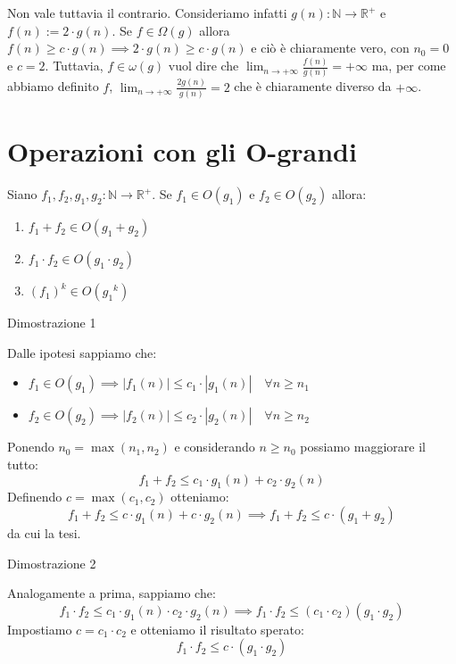 \documentclass[12pt]{report}
\newcommand{\N}{\mathbb{N}}
\newcommand{\R}{\mathbb{R}}
\begin{document}
	Non vale tuttavia il contrario. Consideriamo infatti $g(n): \N \to \R^+$ e $f(n) := 2 \cdot g(n)$.
	Se $f \in \Omega(g)$ allora $f(n) \ge c \cdot g(n) \implies 2 \cdot g(n) \ge c \cdot g(n)$ e ciò è chiaramente vero, con $n_0 = 0$ e $c = 2$.
	Tuttavia, $f \in \omega(g)$ vuol dire che $\lim_{n \to +\infty} \frac{f(n)}{g(n)} = +\infty$ ma, per come abbiamo definito $f$, $\lim_{n \to +\infty} \frac{2g(n)}{g(n)} = 2$ che è chiaramente diverso da $+\infty$.
	
	\section{Operazioni con gli O-grandi}
	Siano $f_1, f_2, g_1, g_2: \N \to \R^+$.
	Se $f_1 \in O(g_1)$ e $f_2 \in O(g_2)$ allora:
	\begin{enumerate}
		
		\item $f_1 + f_2 \in O(g_1 + g_2)$
		
		\item $f_1 \cdot f_2 \in O(g_1 \cdot g_2)$
		
		\item $(f_1)^k \in O({g_1}^k)$
		
	\end{enumerate}
	
	\begin{dimostrazione}{Dimostrazione 1}{}
		
		Dalle ipotesi sappiamo che:
		\begin{itemize}
			
			\item $f_1 \in O(g_1) \implies |f_1(n)| \le c_1 \cdot |g_1(n)| \quad \forall n \ge n_1$
			
			\item $f_2 \in O(g_2) \implies |f_2(n)| \le c_2 \cdot |g_2(n)| \quad \forall n \ge n_2$
			
		\end{itemize}
		Ponendo $n_0 = \max(n_1, n_2)$ e considerando $n \ge n_0$ possiamo maggiorare il tutto:
		\[
		f_1 + f_2 \le c_1 \cdot g_1(n) + c_2 \cdot g_2(n)
		\]
		Definendo $c = \max(c_1, c_2)$ otteniamo:
		\[
		f_1 + f_2 \le c \cdot g_1(n) + c \cdot g_2(n) \implies f_1 + f_2 \le c \cdot (g_1 + g_2)
		\]
		da cui la tesi.
		
	\end{dimostrazione}
	
	\begin{dimostrazione}{Dimostrazione 2}{}
		
		Analogamente a prima, sappiamo che:
		\[
		f_1 \cdot f_2 \le c_1 \cdot g_1(n) \cdot c_2 \cdot g_2(n) \implies f_1 \cdot f_2 \le (c_1 \cdot c_2)(g_1 \cdot g_2)
		\]
		Impostiamo $c = c_1 \cdot c_2$ e otteniamo il risultato sperato:
		\[
		f_1 \cdot f_2 \le c \cdot (g_1 \cdot g_2)
		\]
		
	\end{dimostrazione}
	
\end{document}
